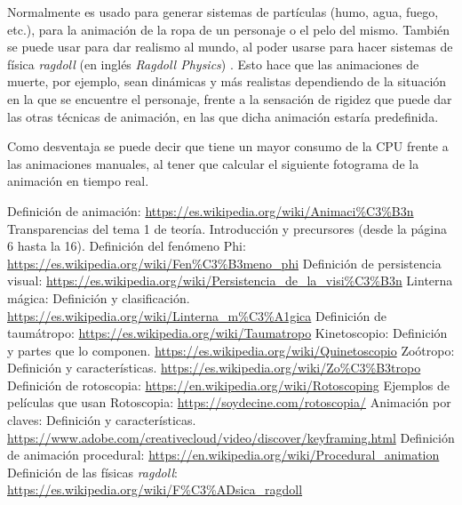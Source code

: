 \documentclass{article}
\begin{document}
\bigskip

Normalmente es usado para generar sistemas de partículas (humo, agua, fuego, etc.), para la animación de la ropa de un personaje o el pelo del mismo. También se puede usar para dar realismo al mundo, al poder usarse para hacer sistemas de física \textit{ragdoll} (en inglés \textit{Ragdoll Physics}) \cite{ragdoll}. 
Esto hace que las animaciones de muerte, por ejemplo, sean dinámicas y más realistas dependiendo de la situación en la que se encuentre el personaje, frente a la sensación de rigidez que puede dar las otras técnicas de animación, en las que dicha animación estaría predefinida.

\bigskip

Como desventaja se puede decir que tiene un mayor consumo de la CPU frente a las animaciones manuales, al tener que calcular el siguiente fotograma de la animación en tiempo real.

\newpage


\begin{thebibliography}{1}
     Definición de animación: \url{https://es.wikipedia.org/wiki/Animaci%C3%B3n}
     Transparencias del tema 1 de teoría. Introducción y precursores (desde la página 6 hasta la 16).
     Definición del fenómeno Phi: \url{https://es.wikipedia.org/wiki/Fen%C3%B3meno_phi}
     Definición de persistencia visual: \url{https://es.wikipedia.org/wiki/Persistencia_de_la_visi%C3%B3n}
     Linterna mágica: Definición y clasificación. \url{https://es.wikipedia.org/wiki/Linterna_m%C3%A1gica}
     Definición de taumátropo: \url{https://es.wikipedia.org/wiki/Taumatropo}
     Kinetoscopio: Definición y partes que lo componen. \url{https://es.wikipedia.org/wiki/Quinetoscopio}
     Zoótropo: Definición y características. \url{https://es.wikipedia.org/wiki/Zo%C3%B3tropo}
     Definición de rotoscopia: \url{https://en.wikipedia.org/wiki/Rotoscoping}
     Ejemplos de películas que usan Rotoscopia: \url{https://soydecine.com/rotoscopia/}
     Animación por claves: Definición y características. \url{https://www.adobe.com/creativecloud/video/discover/keyframing.html}
     Definición de animación procedural: \url{https://en.wikipedia.org/wiki/Procedural_animation}
     Definición de las físicas \textit{ragdoll}: \url{https://es.wikipedia.org/wiki/F%C3%ADsica_ragdoll}
\end{thebibliography}
\end{document}
